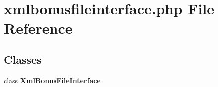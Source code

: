 \section{xmlbonusfileinterface.php File Reference}
\label{xmlbonusfileinterface_8php}


\subsection*{Classes}
\begin{CompactItemize}
\item 
class {\bf Xml\-Bonus\-File\-Interface}
\end{CompactItemize}
